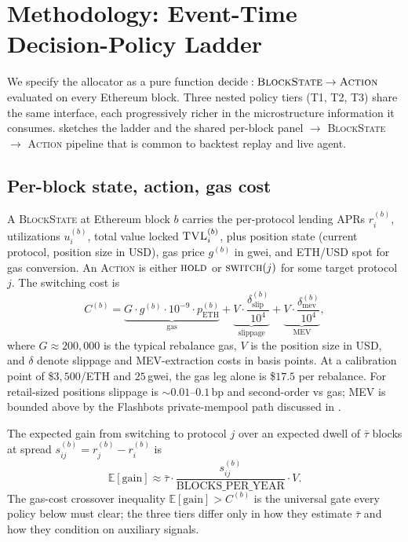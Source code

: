 \section{Methodology: Event-Time Decision-Policy Ladder}
\label{sec:methodology}

We specify the allocator as a pure function
$\textrm{decide}: \textsc{BlockState} \to \textsc{Action}$ evaluated
on every Ethereum block.  Three nested policy tiers (T1, T2, T3)
share the same interface, each progressively richer in the
microstructure information it consumes.  
sketches the ladder and the shared per-block panel
$\to$ \textsc{BlockState} $\to$ \textsc{Action} pipeline that is
common to backtest replay and live agent.



\subsection{Per-block state, action, gas cost}
\label{sec:methodology-state}

A \textsc{BlockState} at Ethereum block $b$ carries the per-protocol
lending APRs $r_i^{(b)}$, utilizations $u_i^{(b)}$, total value
locked $\textsc{TVL}_i^{(b)}$, plus position state (current
protocol, position size in USD), gas price $g^{(b)}$ in gwei, and
ETH/USD spot for gas conversion.  An \textsc{Action} is either
$\textsc{hold}$ or $\textsc{switch}(j)$ for some target protocol
$j$.  The switching cost is
\begin{equation}
\label{eq:cost}
C^{(b)} = \underbrace{G \cdot g^{(b)} \cdot 10^{-9} \cdot
            p_{\text{ETH}}^{(b)}}_{\text{gas}}
        + \underbrace{V \cdot \frac{\delta^{(b)}_{\text{slip}}}{10^{4}}}_{\text{slippage}}
        + \underbrace{V \cdot \frac{\delta^{(b)}_{\text{mev}}}{10^{4}}}_{\text{MEV}},
\end{equation}
where $G \approx 200{,}000$ is the typical rebalance gas, $V$ is the
position size in USD, and $\delta$ denote slippage and MEV-extraction
costs in basis points.  At a calibration point of \$$3{,}500$/ETH and
$25$\,gwei, the gas leg alone is \$$17.5$ per rebalance.  For
retail-sized positions slippage is $\sim 0.01$--$0.1$\,bp and
second-order vs gas; MEV is bounded above by the Flashbots
private-mempool path discussed in .

The expected gain from switching to protocol $j$ over an expected
dwell of $\bar\tau$ blocks at spread $s_{ij}^{(b)} = r_j^{(b)} -
r_i^{(b)}$ is
\begin{equation}
\label{eq:gain}
\mathbb{E}[\text{gain}] \approx
  \bar\tau \cdot \frac{s_{ij}^{(b)}}{\text{BLOCKS\_PER\_YEAR}}
  \cdot V .
\end{equation}
The gas-cost crossover inequality $\mathbb{E}[\text{gain}] > C^{(b)}$
is the universal gate every policy below must clear; the three
tiers differ only in how they estimate $\bar\tau$ and how they
condition on auxiliary signals.

